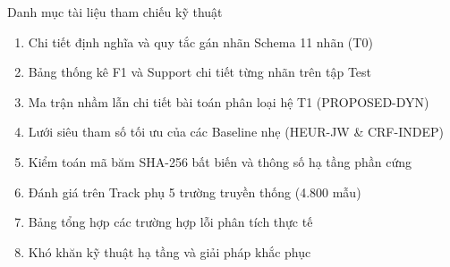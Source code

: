 \documentclass[aspectratio=169, 9pt]{beamer}
\begin{document}

\begin{frame}{Danh mục tài liệu tham chiếu kỹ thuật}
  \vspace{0.2cm}
  {\fontsize{8pt}{10.5pt}\selectfont
  \begin{enumerate}[\bfseries 1.]
    \setlength{\itemsep}{0.2cm}
    \item Chi tiết định nghĩa và quy tắc gán nhãn Schema 11 nhãn (T0)
    \item Bảng thống kê F1 và Support chi tiết từng nhãn trên tập Test
    \item Ma trận nhầm lẫn chi tiết bài toán phân loại hệ T1 (PROPOSED-DYN)
    \item Lưới siêu tham số tối ưu của các Baseline nhẹ (HEUR-JW \& CRF-INDEP)
    \item Kiểm toán mã băm SHA-256 bất biến và thông số hạ tầng phần cứng
    \item Đánh giá trên Track phụ 5 trường truyền thống (4.800 mẫu)
    \item Bảng tổng hợp các trường hợp lỗi phân tích thực tế
    \item Khó khăn kỹ thuật hạ tầng và giải pháp khắc phục
  \end{enumerate}
  }
\end{frame}
\end{document}

